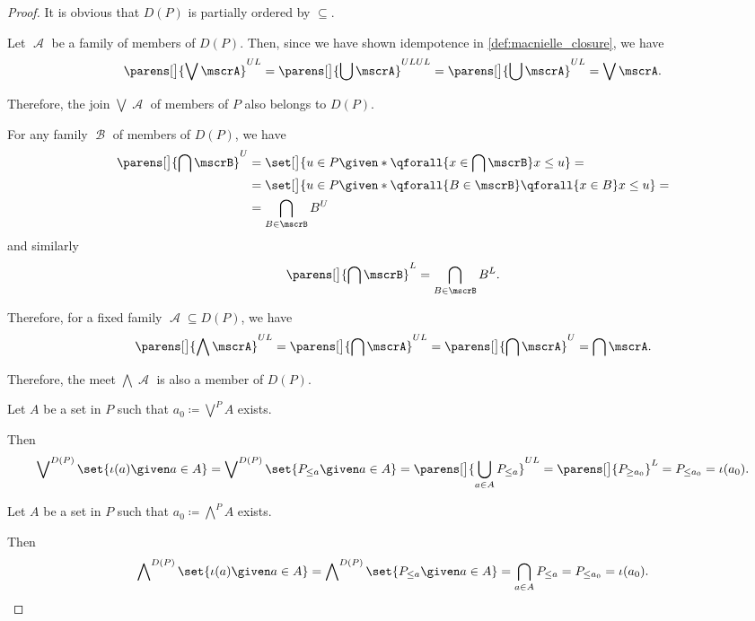 \begin{proof}
  It is obvious that \( D(P) \) is partially ordered by \( \subseteq \).

   Let \( \mscrA \) be a family of members of \( D(P) \). Then, since we have shown idempotence in \cref{def:macnielle_closure}, we have
  \begin{equation*}
    \parens[\big]{ \bigvee \mscrA }^{UL}
    =
    \parens[\big]{ \bigcup \mscrA }^{ULUL}
    =
    \parens[\big]{ \bigcup \mscrA }^{UL}
    =
    \bigvee \mscrA.
  \end{equation*}

  Therefore, the join \( \bigvee \mscrA \) of members of \( P \) also belongs to \( D(P) \).

   For any family \( \mscrB \) of members of \( D(P) \), we have
  \begin{align*}
    \parens[\big]{ \bigcap \mscrB }^U
    &=
    \set[\big]{ u \in P \given* \qforall {x \in \bigcap \mscrB} x \leq u }
    = \\ &=
    \set[\big]{ u \in P \given* \qforall {B \in \mscrB} \qforall {x \in B} x \leq u }
    = \\ &=
    \bigcap_{B \in \mscrB} B^U
  \end{align*}
  and similarly
  \begin{equation*}
    \parens[\big]{ \bigcap \mscrB }^L
    =
    \bigcap_{B \in \mscrB} B^L.
  \end{equation*}

  Therefore, for a fixed family \( \mscrA \subseteq D(P) \), we have
  \begin{equation*}
    \parens[\big]{ \bigwedge \mscrA }^{UL}
    =
    \parens[\big]{ \bigcap \mscrA }^{UL}
    =
    \parens[\big]{ \bigcap \mscrA }^U
    =
    \bigcap \mscrA.
  \end{equation*}

  Therefore, the meet \( \bigwedge \mscrA \) is also a member of \( D(P) \).

   Let \( A \) be a set in \( P \) such that \( a_0 \coloneqq \bigvee^P A \) exists.

  Then
  \begin{equation*}
    \bigvee\nolimits^{D(P)} \set{ \iota(a) \given a \in A }
    =
    \bigvee\nolimits^{D(P)} \set{ P_{\leq a} \given a \in A }
    =
    \parens[\big]{ \bigcup_{a \in A} P_{\leq a} }^{UL}
    =
    \parens[\big]{ P_{\geq a_0} }^L
    =
    P_{\leq a_0}
    =
    \iota(a_0).
  \end{equation*}

   Let \( A \) be a set in \( P \) such that \( a_0 \coloneqq \bigwedge^P A \) exists.

  Then
  \begin{equation*}
    \bigwedge\nolimits^{D(P)} \set{ \iota(a) \given a \in A }
    =
    \bigwedge\nolimits^{D(P)} \set{ P_{\leq a} \given a \in A }
    =
    \bigcap_{a \in A} P_{\leq a}
    =
    P_{\leq a_0}
    =
    \iota(a_0).
  \end{equation*}
\end{proof}

